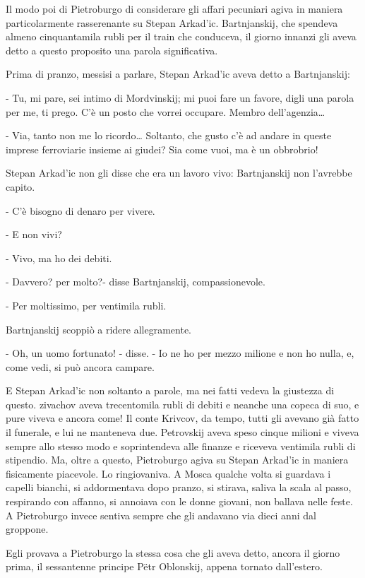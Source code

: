 Il modo poi di Pietroburgo di considerare gli affari pecuniari agiva in maniera particolarmente rasserenante su Stepan Arkad'ic. Bartnjanskij, che spendeva almeno cinquantamila rubli per il train che conduceva, il giorno innanzi gli aveva detto a questo proposito una parola significativa. 

Prima di pranzo, messisi a parlare, Stepan Arkad'ic aveva detto a Bartnjanskij: 

- Tu, mi pare, sei intimo di Mordvinskij; mi puoi fare un favore, digli una parola per me, ti prego. C'è un posto che vorrei occupare. Membro dell'agenzia\ldots{} 

- Via, tanto non me lo ricordo\ldots{} Soltanto, che gusto c'è ad andare in queste imprese ferroviarie insieme ai giudei? Sia come vuoi, ma è un obbrobrio! 

Stepan Arkad'ic non gli disse che era un lavoro vivo: Bartnjanskij non l'avrebbe capito. 

- C'è bisogno di denaro per vivere. 

- E non vivi? 

- Vivo, ma ho dei debiti. 

- Davvero? per molto?- disse Bartnjanskij, compassionevole. 

- Per moltissimo, per ventimila rubli. 

Bartnjanskij scoppiò a ridere allegramente. 

- Oh, un uomo fortunato! - disse. - Io ne ho per mezzo milione e non ho nulla, e, come vedi, si può ancora campare. 

E Stepan Arkad'ic non soltanto a parole, ma nei fatti vedeva la giustezza di questo. zivachov aveva trecentomila rubli di debiti e neanche una copeca di suo, e pure viveva e ancora come! Il conte Krivcov, da tempo, tutti gli avevano già fatto il funerale, e lui ne manteneva due. Petrovskij aveva speso cinque milioni e viveva sempre allo stesso modo e soprintendeva alle finanze e riceveva ventimila rubli di stipendio. Ma, oltre a questo, Pietroburgo agiva su Stepan Arkad'ic in maniera fisicamente piacevole. Lo ringiovaniva. A Mosca qualche volta si guardava i capelli bianchi, si addormentava dopo pranzo, si stirava, saliva la scala al passo, respirando con affanno, si annoiava con le donne giovani, non ballava nelle feste. A Pietroburgo invece sentiva sempre che gli andavano via dieci anni dal groppone. 

Egli provava a Pietroburgo la stessa cosa che gli aveva detto, ancora il giorno prima, il sessantenne principe Pëtr Oblonskij, appena tornato dall'estero. 

